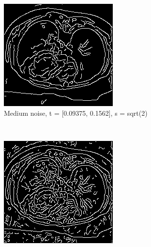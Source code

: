 \begin{figure}[H]
  \centering
  
	\begin{subfigure}{.5\textwidth}
    \centering
    \includegraphics[width=.9\textwidth]{./edgedetection/medium_noise/m_noise_insens_l_thres}
    \caption{Medium noise, t = [0.09375, 0.1562], s = sqrt(2)}
    \label{fig:m_noise_insens_l_thres}
  \end{subfigure}\\%
    \begin{subfigure}{.5\textwidth}
    \centering
    \includegraphics[width=.9\textwidth]{./edgedetection/medium_noise/m_noise_sens_h_thres}

\end{subfigure}
\end{figure}
